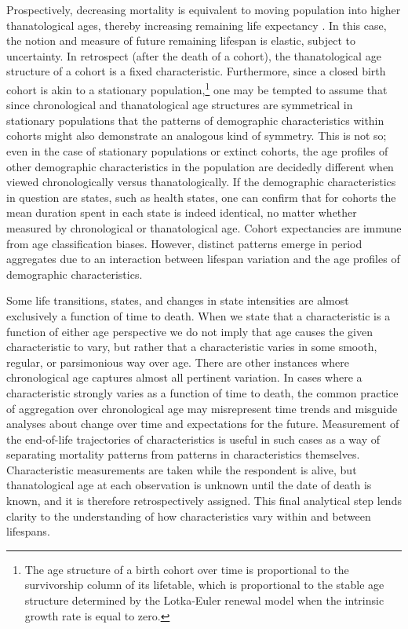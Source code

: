 \documentclass[11pt,oneside]{article} %
\begin{document}
Prospectively, decreasing mortality is equivalent to moving population into
higher thanatological ages, thereby increasing remaining life expectancy \citep{sanderson2005average}. In this case,
the notion and measure of future remaining lifespan is elastic, subject to
uncertainty.
In retrospect (after the death of a cohort), the thanatological age structure of
a cohort is a fixed characteristic. Furthermore, since a closed birth
cohort is akin to a stationary population,\footnote{The age structure of a birth
cohort over time is proportional to the survivorship column of its lifetable, which is proportional to the stable age structure determined by the Lotka-Euler renewal model when the intrinsic growth rate is equal to zero.} one may be
tempted to assume that since chronological and thanatological age structures are
symmetrical in stationary populations
\citep{brouard1989mouvements,vaupel2009life,pancho2015} that the patterns of
demographic characteristics within cohorts might also demonstrate an
analogous kind of symmetry.
This is not so; even in the case of stationary populations or extinct cohorts,
the age profiles of other demographic characteristics in the population are decidedly different when
viewed chronologically versus thanatologically. If the demographic
characteristics in question are states, such as health states, one can confirm
that for cohorts the mean duration spent in each state is indeed identical, no
matter whether measured by chronological or thanatological age. Cohort
expectancies are immune from age classification biases. However, distinct
patterns emerge in period aggregates due to an interaction between lifespan
variation and the age profiles of demographic characteristics. 

Some life
transitions, states, and changes in state intensities are almost exclusively a
function of time to death. When we state that a characteristic is a
function of either age perspective we do not imply that age causes the given characteristic to vary, but rather that a characteristic varies in some smooth, regular, or parsimonious way over age. There are other instances where chronological age captures almost all pertinent variation. In cases where a characteristic strongly varies as a
function of time to death,
the common practice of aggregation over chronological age may misrepresent time
trends and misguide analyses about change over time and expectations for the
future. Measurement of the
end-of-life trajectories of characteristics is useful in such cases as a way of separating
mortality patterns from patterns in characteristics themselves.
Characteristic measurements are taken while the respondent is alive, but
thanatological age at each observation is unknown until the date of death is
known, and it is therefore retrospectively assigned. This final analytical step
lends clarity to the understanding of how characteristics vary within and
between lifespans.
\end{document}
